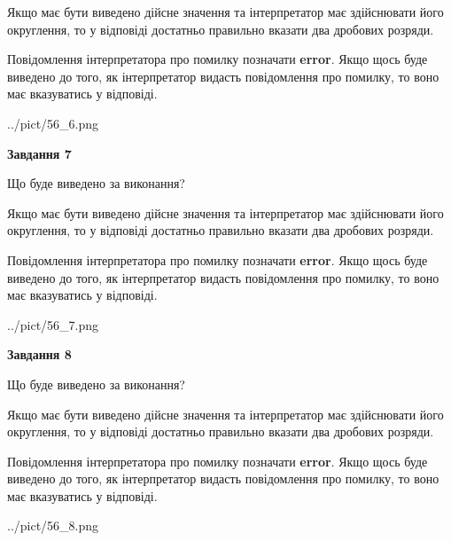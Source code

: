 \documentclass[12pt, ukrainian]{article}
\begin{document}
{\begin {Large}
Якщо має бути виведено дійсне значення та інтерпретатор має здійснювати його округлення, 
то у відповіді достатньо правильно вказати два дробових розряди.

Повідомлення інтерпретатора про помилку позначати \textbf{error}.
Якщо щось буде виведено до того, як інтерпретатор видасть повідомлення про помилку, 
то воно має вказуватись у відповіді. \par

\begin{center}
	{../pict/56_6.png}
\end{center}
\newpage

{\begin {center}\textbf{Завдання 7}\end {center}}\par
Що буде виведено за виконання? \par

Якщо має бути виведено дійсне значення та інтерпретатор має здійснювати його округлення, 
то у відповіді достатньо правильно вказати два дробових розряди.

Повідомлення інтерпретатора про помилку позначати \textbf{error}.
Якщо щось буде виведено до того, як інтерпретатор видасть повідомлення про помилку, 
то воно має вказуватись у відповіді. \par

\begin{center}
	{../pict/56_7.png}
\end{center}
\newpage

{\begin {center}\textbf{Завдання 8}\end {center}}\par
Що буде виведено за виконання? \par

Якщо має бути виведено дійсне значення та інтерпретатор має здійснювати його округлення, 
то у відповіді достатньо правильно вказати два дробових розряди.

Повідомлення інтерпретатора про помилку позначати \textbf{error}.
Якщо щось буде виведено до того, як інтерпретатор видасть повідомлення про помилку, 
то воно має вказуватись у відповіді. \par

\begin{center}
	{../pict/56_8.png}
\end{center}
\newpage


\end{Large}}
\end{document}
